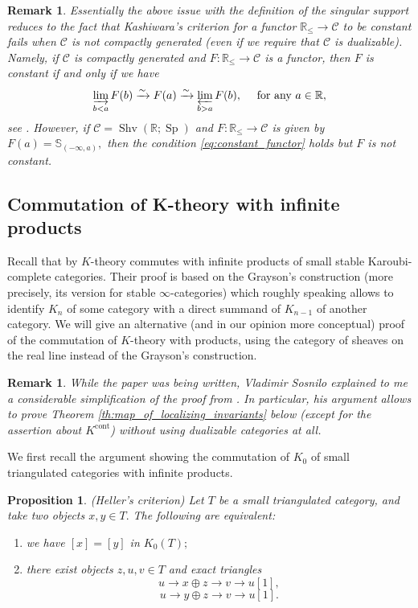 \documentclass[11pt,leqno]{amsart}
\newtheorem{prop}[theo]{Proposition}
\newtheorem{remark}[theo]{Remark}
\numberwithin{equation}{section}
\def\R{\mathbb{R}}
\def\bS{\mathbb{S}}
\newcommand{\indlim}[1][]{\mathop{\varinjlim}\limits_{#1}}
\newcommand{\prolim}[1][]{\mathop{\varprojlim}\limits_{#1}}
\newcommand{\xto}{\xrightarrow}
\newcommand{\cont}{\operatorname{cont}}
\newcommand{\cC}{{\mathcal C}}
\newcommand{\Sh}{\operatorname{Shv}}
\newcommand{\Sp}{\operatorname{Sp}}
\begin{document}
\begin{remark}\label{rem:constant_functor_criterion} Essentially the above issue with the definition of the singular support reduces to the fact that Kashiwara's criterion for a functor $\R_{\leq}\to\cC$ to be constant fails when $\cC$ is not compactly generated (even if we require that $\cC$ is dualizable). Namely, if $\cC$ is compactly generated and $F:\R_{\leq}\to\cC$ is a functor, then $F$ is constant if and only if we have
\begin{equation}\label{eq:constant_functor}\indlim[b<a]F(b)\xto{\sim}F(a)\xto{\sim}\prolim[b>a]F(b),\quad\text{ for any }a\in\R,\end{equation}
see \cite[Corollary 3.2]{RS}.
However, if $\cC=\Sh(\R;\Sp)$ and $F:\R_{\leq}\to\cC$ is given by $F(a)=\bS_{(-\infty,a)},$ then the condition \eqref{eq:constant_functor} holds but $F$ is not constant.\end{remark}

\subsection{Commutation of K-theory with infinite products}
\label{ssec:K_theory_of_products}

Recall that by \cite{KW19} $K$-theory commutes with infinite products of small stable Karoubi-complete categories. Their proof is based on the Grayson's construction \cite{Gra12} (more precisely, its version for stable $\infty$-categories) which roughly speaking allows to identify $K_n$ of some category with a direct summand of $K_{n-1}$ of another category. We will give an alternative (and in our opinion more conceptual) proof of the commutation of $K$-theory with products, using the category of sheaves on the real line instead of the Grayson's construction.

\begin{remark}While the paper was being written, Vladimir Sosnilo explained to me a considerable simplification of the proof from \cite{KW19}. In particular, his argument allows to prove Theorem \ref{th:map_of_localizing_invariants} below (except for the assertion about $K^{\cont}$) without using dualizable categories at all.\end{remark}

We first recall the argument showing the commutation of $K_0$ of small triangulated categories with infinite products.

\begin{prop}\cite[Lemma 2.12]{KW19}(Heller's criterion) Let $T$ be a small triangulated category, and take two objects $x,y\in T.$ The following are equivalent:

\begin{enumerate}[label=(\roman*),ref=(\roman*)]
\item we have $[x]=[y]$ in $K_0(T);$

\item there exist objects $z,u,v\in T$ and exact triangles
$$u\to x\oplus z\to v\to u[1],$$
$$u\to y\oplus z\to v\to u[1].$$
\end{enumerate}\end{prop}
\end{document}
